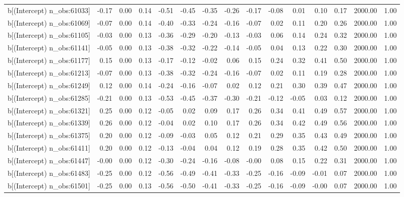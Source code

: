 \begin{table}[ht]
\begin{tabular}{rrrrrrrrrrrrrrr}
  b[(Intercept) n\_obs:61033] & -0.17 & 0.00 & 0.14 & -0.51 & -0.45 & -0.35 & -0.26 & -0.17 & -0.08 & 0.01 & 0.10 & 0.17 & 2000.00 & 1.00 \\ 
  b[(Intercept) n\_obs:61069] & -0.07 & 0.00 & 0.14 & -0.40 & -0.33 & -0.24 & -0.16 & -0.07 & 0.02 & 0.11 & 0.20 & 0.26 & 2000.00 & 1.00 \\ 
  b[(Intercept) n\_obs:61105] & -0.03 & 0.00 & 0.13 & -0.36 & -0.29 & -0.20 & -0.13 & -0.03 & 0.06 & 0.14 & 0.24 & 0.32 & 2000.00 & 1.00 \\ 
  b[(Intercept) n\_obs:61141] & -0.05 & 0.00 & 0.13 & -0.38 & -0.32 & -0.22 & -0.14 & -0.05 & 0.04 & 0.13 & 0.22 & 0.30 & 2000.00 & 1.00 \\ 
  b[(Intercept) n\_obs:61177] & 0.15 & 0.00 & 0.13 & -0.17 & -0.12 & -0.02 & 0.06 & 0.15 & 0.24 & 0.32 & 0.41 & 0.50 & 2000.00 & 1.00 \\ 
  b[(Intercept) n\_obs:61213] & -0.07 & 0.00 & 0.13 & -0.38 & -0.32 & -0.24 & -0.16 & -0.07 & 0.02 & 0.11 & 0.19 & 0.28 & 2000.00 & 1.00 \\ 
  b[(Intercept) n\_obs:61249] & 0.12 & 0.00 & 0.14 & -0.24 & -0.16 & -0.07 & 0.02 & 0.12 & 0.21 & 0.30 & 0.39 & 0.47 & 2000.00 & 1.00 \\ 
  b[(Intercept) n\_obs:61285] & -0.21 & 0.00 & 0.13 & -0.53 & -0.45 & -0.37 & -0.30 & -0.21 & -0.12 & -0.05 & 0.03 & 0.12 & 2000.00 & 1.00 \\ 
  b[(Intercept) n\_obs:61321] & 0.25 & 0.00 & 0.12 & -0.05 & 0.02 & 0.09 & 0.17 & 0.26 & 0.34 & 0.41 & 0.49 & 0.57 & 2000.00 & 1.00 \\ 
  b[(Intercept) n\_obs:61339] & 0.26 & 0.00 & 0.12 & -0.04 & 0.02 & 0.10 & 0.17 & 0.26 & 0.34 & 0.42 & 0.49 & 0.56 & 2000.00 & 1.00 \\ 
  b[(Intercept) n\_obs:61375] & 0.20 & 0.00 & 0.12 & -0.09 & -0.03 & 0.05 & 0.12 & 0.21 & 0.29 & 0.35 & 0.43 & 0.49 & 2000.00 & 1.00 \\ 
  b[(Intercept) n\_obs:61411] & 0.20 & 0.00 & 0.12 & -0.13 & -0.04 & 0.04 & 0.12 & 0.19 & 0.28 & 0.35 & 0.42 & 0.50 & 2000.00 & 1.00 \\ 
  b[(Intercept) n\_obs:61447] & -0.00 & 0.00 & 0.12 & -0.30 & -0.24 & -0.16 & -0.08 & -0.00 & 0.08 & 0.15 & 0.22 & 0.31 & 2000.00 & 1.00 \\ 
  b[(Intercept) n\_obs:61483] & -0.25 & 0.00 & 0.12 & -0.56 & -0.49 & -0.41 & -0.33 & -0.25 & -0.16 & -0.09 & -0.01 & 0.07 & 2000.00 & 1.00 \\ 
  b[(Intercept) n\_obs:61501] & -0.25 & 0.00 & 0.13 & -0.56 & -0.50 & -0.41 & -0.33 & -0.25 & -0.16 & -0.09 & -0.00 & 0.07 & 2000.00 & 1.00 \\ 

\end{tabular}
\end{table}
